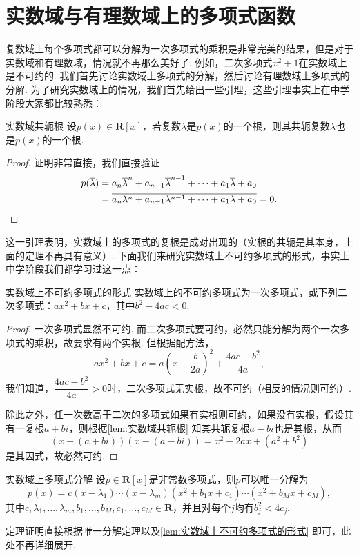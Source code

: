 \section{实数域与有理数域上的多项式函数}
复数域上每个多项式都可以分解为一次多项式的乘积是非常完美的结果，但是对于实数域和有理数域，情况就不再那么美好了. 例如，二次多项式$x^2+1$在实数域上是不可约的. 我们首先讨论实数域上多项式的分解，然后讨论有理数域上多项式的分解. 为了研究实数域上的情况，我们首先给出一些引理，这些引理事实上在中学阶段大家都比较熟悉：
\begin{lemma}{}{实数域共轭根}
    设$p(x)\in\mathbf{R}[x]$，若复数$\lambda$是$p(x)$的一个根，则其共轭复数$\overline{\lambda}$也是$p(x)$的一个根.
\end{lemma}
\begin{proof}
    证明非常直接，我们直接验证
    \begin{align*}
        p(\overline{\lambda}) & =a_n\overline{\lambda}^n+a_{n-1}\overline{\lambda}^{n-1}+\cdots+a_1\overline{\lambda}+a_0 \\
                              & =\overline{a_n\lambda^n+a_{n-1}\lambda^{n-1}+\cdots+a_1\lambda+a_0}=0. \qedhere
    \end{align*}
\end{proof}
这一引理表明，实数域上的多项式的复根是成对出现的（实根的共轭是其本身，上面的定理不再具有意义）. 下面我们来研究实数域上不可约多项式的形式，事实上中学阶段我们都学习过这一点：
\begin{lemma}{}{实数域上不可约多项式的形式}
    实数域上的不可约多项式为一次多项式，或下列二次多项式：$ax^2+bx+c$，其中$b^2-4ac<0$.
\end{lemma}
\begin{proof}
    一次多项式显然不可约. 而二次多项式要可约，必然只能分解为两个一次多项式的乘积，故要求有两个实根. 但根据配方法，
    \[ax^2+bx+c=a\left(x+\dfrac{b}{2a}\right)^2+\dfrac{4ac-b^2}{4a},\]
    我们知道，$\dfrac{4ac-b^2}{4a}>0$时，二次多项式无实根，故不可约（相反的情况则可约）.

    除此之外，任一次数高于二次的多项式如果有实根则可约，如果没有实根，假设其有一复根$a+bi$，则根据\autoref{lem:实数域共轭根} 知其共轭复根$a-bi$也是其根，从而
    \[(x-(a+bi))(x-(a-bi))=x^2-2ax+(a^2+b^2)\]
    是其因式，故必然可约.
\end{proof}

\begin{theorem}{}{实数域上多项式分解}
    设$p\in\mathbf{R}[x]$是非常数多项式，则$p$可以唯一分解为
    \[p(x)=c(x-\lambda_1)\cdots(x-\lambda_m)(x^2+b_1x+c_1)\cdots(x^2+b_Mx+c_M),\]
    其中$c,\lambda_1,\ldots,\lambda_m,b_1,\ldots,b_M,c_1,\ldots,c_M\in\mathbf{R}$，并且对每个$j$均有$b_j^2<4c_j$.
\end{theorem}
定理证明直接根据唯一分解定理以及\autoref{lem:实数域上不可约多项式的形式} 即可，此处不再详细展开.

